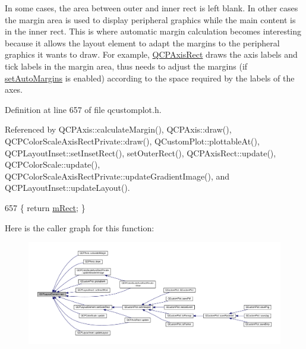In some cases, the area between outer and inner rect is left blank. In other cases the margin area is used to display peripheral graphics while the main content is in the inner rect. This is where automatic margin calculation becomes interesting because it allows the layout element to adapt the margins to the peripheral graphics it wants to draw. For example, \hyperlink{class_q_c_p_axis_rect}{Q\+C\+P\+Axis\+Rect} draws the axis labels and tick labels in the margin area, thus needs to adjust the margins (if \hyperlink{class_q_c_p_layout_element_accfda49994e3e6d51ed14504abf9d27d}{set\+Auto\+Margins} is enabled) according to the space required by the labels of the axes. 

Definition at line 657 of file qcustomplot.\+h.



Referenced by Q\+C\+P\+Axis\+::calculate\+Margin(), Q\+C\+P\+Axis\+::draw(), Q\+C\+P\+Color\+Scale\+Axis\+Rect\+Private\+::draw(), Q\+Custom\+Plot\+::plottable\+At(), Q\+C\+P\+Layout\+Inset\+::set\+Inset\+Rect(), set\+Outer\+Rect(), Q\+C\+P\+Axis\+Rect\+::update(), Q\+C\+P\+Color\+Scale\+::update(), Q\+C\+P\+Color\+Scale\+Axis\+Rect\+Private\+::update\+Gradient\+Image(), and Q\+C\+P\+Layout\+Inset\+::update\+Layout().


\begin{DoxyCode}
657 \{ \textcolor{keywordflow}{return} \hyperlink{class_q_c_p_layout_element_ad8896f05550389f7b9e92c9e6cdf6e01}{mRect}; \}
\end{DoxyCode}


Here is the caller graph for this function\+:\nopagebreak
\begin{figure}[H]
\begin{center}
\leavevmode
\includegraphics[width=350pt]{class_q_c_p_layout_element_affdfea003469aac3d0fac5f4e06171bc_icgraph}
\end{center}
\end{figure}


\hypertarget{class_q_c_p_layout_element_a9fcf5d0ea19f2c23b2b528bce2c6f095}{}
